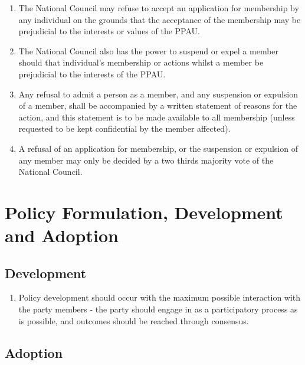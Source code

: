 \documentclass[a4paper,titlepage,8.5pt]{article}
\begin{document}
\begin{enumerate}
\item The National Council may refuse to accept an application for membership by any individual on the grounds that the acceptance of the membership may be prejudicial to the interests or values of the PPAU.
\item The National Council also has the power to suspend or expel a member should that individual’s membership or actions whilst a member be prejudicial to the interests of the PPAU.
\item Any refusal to admit a person as a member, and any suspension or expulsion of a member, shall be accompanied by a written statement of reasons for the action, and this statement is to be made available to all membership (unless requested to be kept confidential by the member affected).
\item A refusal of an application for membership, or the suspension or expulsion of any member may only be decided by a two thirds majority vote of the National Council.
\end{enumerate}

\section{Policy Formulation, Development and Adoption}

\subsection{Development}

\begin{enumerate}
\item Policy development should occur with the maximum possible interaction with the party members - the party should engage in as a participatory process as is possible, and outcomes should be reached through consensus.
\end{enumerate}

\subsection{Adoption}
\end{document}
